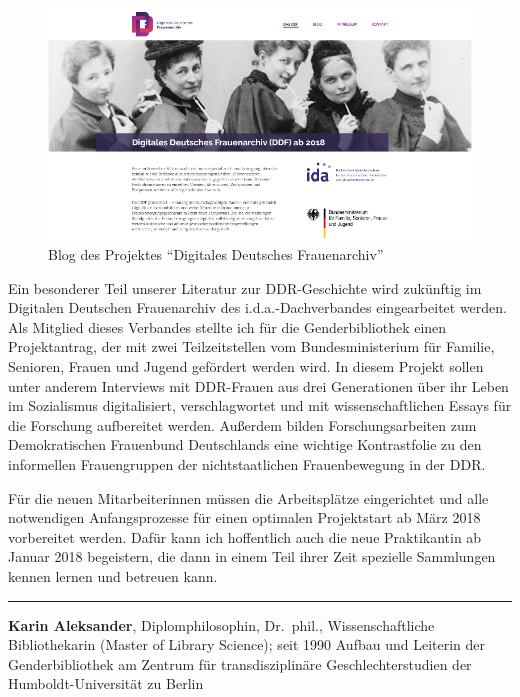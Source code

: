 \documentclass[a4paper,
fontsize=11pt,
oneside,
numbers=noperiodatend,
parskip=half-,
bibliography=totoc,
final
]{scrartcl}
\begin{document}
\begin{figure}
\centering
\includegraphics{img/Aleksander_3.jpg}
\caption{Blog des Projektes \enquote{Digitales Deutsches Frauenarchiv}}
\end{figure}

Ein besonderer Teil unserer Literatur zur DDR-Geschichte wird zukünftig
im Digitalen Deutschen Frauenarchiv des i.d.a.-Dachverbandes
eingearbeitet werden. Als Mitglied dieses Verbandes stellte ich für die
Genderbibliothek einen Projektantrag, der mit zwei Teilzeitstellen vom
Bundesministerium für Familie, Senioren, Frauen und Jugend gefördert
werden wird. In diesem Projekt sollen unter anderem Interviews mit
DDR-Frauen aus drei Generationen über ihr Leben im Sozialismus
digitalisiert, verschlagwortet und mit wissenschaftlichen Essays für die
Forschung aufbereitet werden. Außerdem bilden Forschungsarbeiten zum
Demokratischen Frauenbund Deutschlands eine wichtige Kontrastfolie zu
den informellen Frauengruppen der nichtstaatlichen Frauenbewegung in der
DDR.

Für die neuen Mitarbeiterinnen müssen die Arbeitsplätze eingerichtet und
alle notwendigen Anfangsprozesse für einen optimalen Projektstart ab
März 2018 vorbereitet werden. Dafür kann ich hoffentlich auch die neue
Praktikantin ab Januar 2018 begeistern, die dann in einem Teil ihrer
Zeit spezielle Sammlungen kennen lernen und betreuen kann.

\begin{center}\rule{0.5\linewidth}{\linethickness}\end{center}

\textbf{Karin Aleksander}, Diplomphilosophin, Dr.~phil.,
Wissenschaftliche Bibliothekarin (Master of Library Science); seit 1990
Aufbau und Leiterin der Genderbibliothek am Zentrum für
transdisziplinäre Geschlechterstudien der Humboldt-Universität zu Berlin
\end{document}
